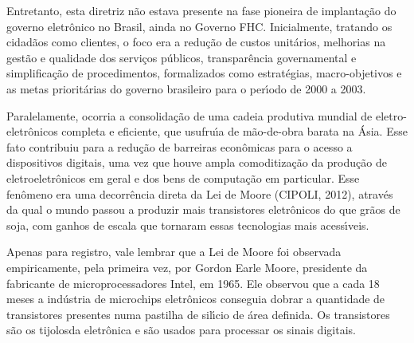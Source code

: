 \documentclass[
12pt,		%
openright,	%
twoside,  %
a4paper,			%
chapter=TITLE,		%
english,			%
french,				%
spanish,			%
brazil				%
]{USPSC-classe/USPSC}
\begin{document}
Entretanto, esta diretriz n\~ao estava presente na fase pioneira de implanta\c{c}\~ao do governo eletr\^onico no Brasil, ainda no Governo FHC. Inicialmente, tratando os cidad\~aos como clientes, o foco era a redu\c{c}\~ao de custos unit\'arios, melhorias na gest\~ao e qualidade dos servi\c{c}os p\'ublicos, transpar\^encia governamental e simplifica\c{c}\~ao de procedimentos, formalizados como estrat\'egias, macro-objetivos e  as metas priorit\'arias  do governo brasileiro para o per\'{\i}odo de 2000 a 2003.

















Paralelamente, ocorria a consolida\c{c}\~ao de uma cadeia produtiva mundial de eletro-eletr\^onicos completa e eficiente, que usufru\'{\i}a de m\~ao-de-obra barata na \'Asia. Esse fato contribuiu para a redu\c{c}\~ao de barreiras econ\^omicas para o acesso a dispositivos digitais, uma vez que houve ampla comoditiza\c{c}\~ao da produ\c{c}\~ao de eletroeletr\^onicos em geral e dos bens de computa\c{c}\~ao em particular. Esse fen\^omeno era uma decorr\^encia direta da Lei de Moore (CIPOLI, 2012), atrav\'es da qual o mundo passou a produzir mais transistores eletr\^onicos do que gr\~aos de soja, com ganhos de escala que tornaram essas tecnologias mais acess\'{\i}veis.

















Apenas para registro, vale lembrar que a Lei de Moore foi observada empiricamente, pela primeira vez, por Gordon Earle Moore, presidente da fabricante de microprocessadores Intel, em 1965. Ele observou que a cada 18 meses a ind\'ustria de microchips eletr\^onicos conseguia dobrar a quantidade de transistores presentes numa pastilha de sil\'{\i}cio de \'area definida. Os transistores s\~ao os \textquotedbl tijolos\textquotedbl  da eletr\^onica e s\~ao usados para processar os sinais digitais.
\end{document}
